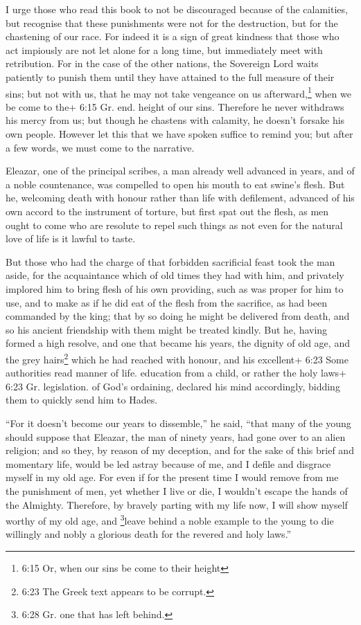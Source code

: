  I urge those who read this book to not be discouraged
because of the calamities, but recognise that these punishments were not
for the destruction, but for the chastening of our race. 
For indeed it is a sign of great kindness that those who act impiously
are not let alone for a long time, but immediately meet with
retribution.  For in the case of the other nations, the
Sovereign Lord waits patiently to punish them until they have attained
to the full measure of their sins; but not with us,  that
he may not take vengeance on us afterward,\footnote{6:15 Or, when our
  sins be come to their height} when we be come to the+ 6:15 Gr. end.
height of our sins.  Therefore he never withdraws his mercy
from us; but though he chastens with calamity, he doesn't forsake his
own people.  However let this that we have spoken suffice
to remind you; but after a few words, we must come to the narrative.

 Eleazar, one of the principal scribes, a man already well
advanced in years, and of a noble countenance, was compelled to open his
mouth to eat swine's flesh.  But he, welcoming death with
honour rather than life with defilement, advanced of his own accord to
the instrument of torture, but first spat out the flesh, 
as men ought to come who are resolute to repel such things as not even
for the natural love of life is it lawful to taste.

 But those who had the charge of that forbidden sacrificial
feast took the man aside, for the acquaintance which of old times they
had with him, and privately implored him to bring flesh of his own
providing, such as was proper for him to use, and to make as if he did
eat of the flesh from the sacrifice, as had been commanded by the king;
 that by so doing he might be delivered from death, and so
his ancient friendship with them might be treated kindly. 
But he, having formed a high resolve, and one that became his years, the
dignity of old age, and the grey hairs\footnote{6:23 The Greek text
  appears to be corrupt.} which he had reached with honour, and his
excellent+ 6:23 Some authorities read manner of life. education from a
child, or rather the holy laws+ 6:23 Gr. legislation. of God's
ordaining, declared his mind accordingly, bidding them to quickly send
him to Hades.

 ``For it doesn't become our years to dissemble,'' he said,
``that many of the young should suppose that Eleazar, the man of ninety
years, had gone over to an alien religion;  and so they, by
reason of my deception, and for the sake of this brief and momentary
life, would be led astray because of me, and I defile and disgrace
myself in my old age.  For even if for the present time I
would remove from me the punishment of men, yet whether I live or die, I
wouldn't escape the hands of the Almighty.  Therefore, by
bravely parting with my life now, I will show myself worthy of my old
age,  and \footnote{6:28 Gr. one that has left behind.}leave
behind a noble example to the young to die willingly and nobly a
glorious death for the revered and holy laws.''

